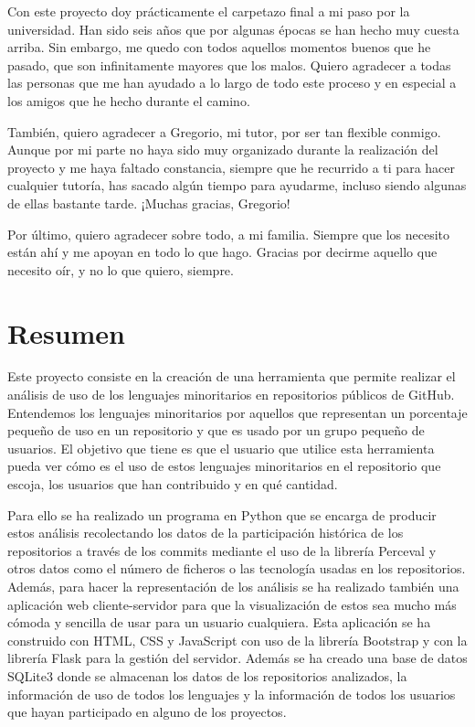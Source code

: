 \documentclass[a4paper, 12pt]{book}
\begin{document}
Con este proyecto doy prácticamente el carpetazo final a mi paso por la universidad. Han sido seis años que por algunas épocas se han hecho muy cuesta arriba.  Sin embargo, me quedo con todos aquellos momentos buenos que he pasado, que son infinitamente mayores que los malos. Quiero agradecer a todas las personas que me han ayudado a lo largo de todo este proceso y en especial a los amigos que he hecho durante el camino.

También, quiero agradecer a Gregorio, mi tutor, por ser tan flexible conmigo. Aunque por mi parte no haya sido muy organizado durante la realización del proyecto y me haya faltado constancia, siempre que he recurrido a ti para hacer cualquier tutoría, has sacado algún tiempo para ayudarme, incluso siendo algunas de ellas bastante tarde. ¡Muchas gracias, Gregorio!

Por último, quiero agradecer sobre todo, a mi familia. Siempre que los necesito están ahí y me apoyan en todo lo que hago. Gracias por decirme aquello que necesito oír, y no lo que quiero, siempre.


\chapter*{Resumen}

Este proyecto consiste en la creación de una herramienta que permite realizar el análisis de uso de los lenguajes minoritarios en repositorios públicos de GitHub. Entendemos los lenguajes minoritarios por aquellos que representan un porcentaje pequeño de uso en un repositorio y que es usado por un grupo pequeño de usuarios. El objetivo que tiene es que el usuario que utilice esta herramienta pueda ver cómo es el uso de estos lenguajes minoritarios en el repositorio que escoja, los usuarios que han contribuido y en qué cantidad.

Para ello se ha realizado un programa en Python que se encarga de producir estos análisis recolectando los datos de la participación histórica de los repositorios a través de los commits mediante el uso de la librería Perceval y otros datos como el número de ficheros o las tecnología usadas en los repositorios. Además, para hacer la representación de los análisis se ha realizado también una aplicación web cliente-servidor para que la visualización de estos sea mucho más cómoda y sencilla de usar para un usuario cualquiera. Esta aplicación se ha construido con HTML, CSS y JavaScript con uso de la librería Bootstrap y con la librería Flask para la gestión del servidor. Además se ha creado una base de datos SQLite3 donde se almacenan los datos de los repositorios analizados, la información de uso de todos los lenguajes y la información de todos los usuarios que hayan participado en alguno de los proyectos.
\end{document}
